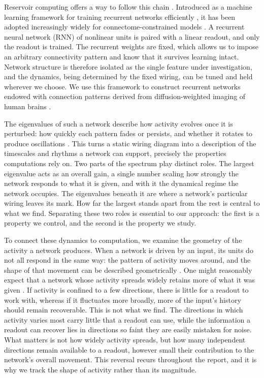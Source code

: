 Reservoir computing offers a way to follow this chain \cite{lukovsevivcius2009reservoir}. 
Introduced as a machine learning framework for training recurrent networks efficiently 
\cite{jaeger2001echo,maass2002real}, it has been adopted increasingly widely for connectome-constrained 
models \cite{suarez2024connectome,suarez2021learning,milisav2026neuromorphic,damicelli2022brain}. 
A recurrent neural network (RNN) of nonlinear units is paired with a linear readout, and only 
the readout is trained. The recurrent weights are fixed, which allows us to impose an arbitrary 
connectivity pattern and know that it survives learning intact. Network structure is therefore isolated 
as the single feature under investigation, and the dynamics, being determined by the fixed wiring, 
can be tuned and held wherever we choose. We use this framework to construct recurrent networks endowed 
with connection patterns derived from diffusion-weighted imaging of human brains \cite{griffa2019structural}.

The eigenvalues of such a network describe how activity evolves once it is perturbed: how quickly each 
pattern fades or persists, and whether it rotates to produce oscillations \cite{lehmann1991eigenvalue, rajan2006eigenvalue}. 
This turns a static wiring diagram into a description of the timescales and rhythms a network can support, 
precisely the properties computations rely on. 
Two parts of the spectrum play distinct roles. The largest eigenvalue acts as an 
overall gain, a single number scaling how strongly the network responds to what it is given, and with 
it the dynamical regime the network occupies. The eigenvalues beneath it are where a network's 
particular wiring leaves its mark. How far the largest stands apart from the rest is central to what 
we find. Separating these two roles is essential to our approach: the first is a property we control, 
and the second is the property we study.

To connect these dynamics to computation, we examine the geometry of the activity a network produces. 
When a network is driven by an input, its units do not all respond in the same way: the pattern of 
activity moves around, and the shape of that movement can be described geometrically 
\cite{chung2021neural,clark2025connectivity}. 
One might reasonably expect that a network whose activity spreads widely retains more of what it was given 
\cite{clark2023dimension,gao2017theory}. If activity is confined to a few directions, there is little for a readout to work with, 
whereas if it fluctuates more broadly, more of the input's history should remain recoverable.
This is not what we find. The directions in which activity varies most carry little that a readout 
can use, while the information a readout can recover lies in directions so faint they are easily mistaken 
for noise. What matters is not how widely activity spreads, but how many independent directions remain 
available to a readout, however small their contribution to the network's overall movement. 
This reversal recurs throughout the report, and it is why we track the shape of activity rather than 
its magnitude.


